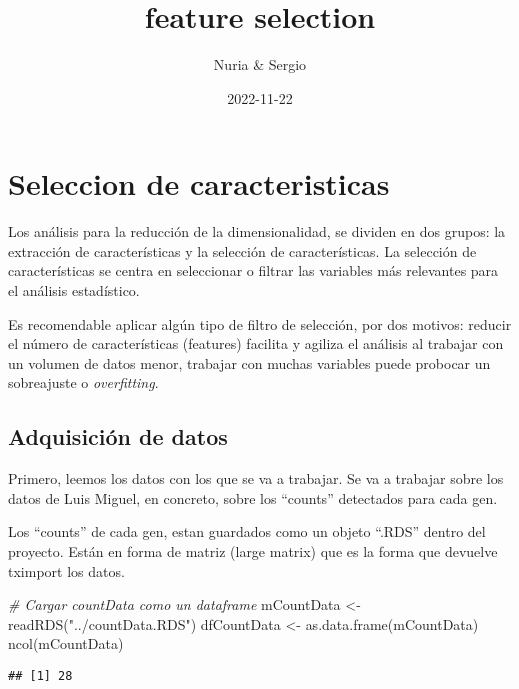 \documentclass[
]{article}
\title{feature selection}
\author{Nuria \& Sergio}
\date{2022-11-22}
\newenvironment{Shaded}{\begin{snugshade}}{\end{snugshade}}
\newcommand{\CommentTok}[1]{\textcolor[rgb]{0.56,0.35,0.01}{\textit{#1}}}
\newcommand{\FunctionTok}[1]{\textcolor[rgb]{0.00,0.00,0.00}{#1}}
\newcommand{\NormalTok}[1]{#1}
\newcommand{\OtherTok}[1]{\textcolor[rgb]{0.56,0.35,0.01}{#1}}
\newcommand{\StringTok}[1]{\textcolor[rgb]{0.31,0.60,0.02}{#1}}
\begin{document}
\maketitle

\hypertarget{seleccion-de-caracteristicas}{%
\section{Seleccion de
caracteristicas}\label{seleccion-de-caracteristicas}}

Los análisis para la reducción de la dimensionalidad, se dividen en dos
grupos: la extracción de características y la selección de
características. La selección de características se centra en
seleccionar o filtrar las variables más relevantes para el análisis
estadístico.

Es recomendable aplicar algún tipo de filtro de selección, por dos
motivos: reducir el número de características (features) facilita y
agiliza el análisis al trabajar con un volumen de datos menor, trabajar
con muchas variables puede probocar un sobreajuste o \emph{overfitting}.

\hypertarget{adquisiciuxf3n-de-datos}{%
\subsection{Adquisición de datos}\label{adquisiciuxf3n-de-datos}}

Primero, leemos los datos con los que se va a trabajar. Se va a trabajar
sobre los datos de Luis Miguel, en concreto, sobre los ``counts''
detectados para cada gen.

Los ``counts'' de cada gen, estan guardados como un objeto ``.RDS''
dentro del proyecto. Están en forma de matriz (large matrix) que es la
forma que devuelve tximport los datos.

\begin{Shaded}
\begin{Highlighting}[]
\CommentTok{\# Cargar countData como un dataframe}
\NormalTok{mCountData }\OtherTok{\textless{}{-}} \FunctionTok{readRDS}\NormalTok{(}\StringTok{"../countData.RDS"}\NormalTok{)}
\NormalTok{dfCountData }\OtherTok{\textless{}{-}} \FunctionTok{as.data.frame}\NormalTok{(mCountData)}
\FunctionTok{ncol}\NormalTok{(mCountData)}
\end{Highlighting}
\end{Shaded}

\begin{verbatim}
## [1] 28
\end{verbatim}
\end{document}
